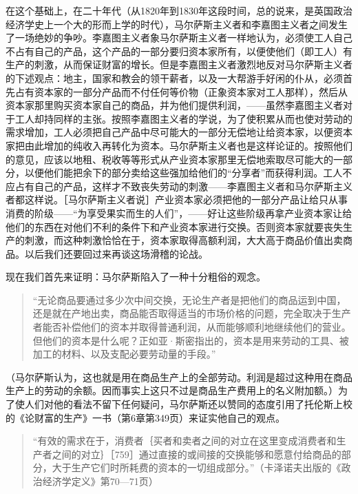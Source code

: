 在这个基础上，在二十年代（从1820年到1830年这段时间，总的说来，是英国政治经济学史上一个大的形而上学的时代），马尔萨斯主义者和李嘉图主义者之间发生了一场绝妙的争吵。李嘉图主义者象马尔萨斯主义者一样地认为，必须使工人自己不占有自己的产品，这个产品的一部分要归资本家所有，以便使他们（即工人）有生产的刺激，从而保证财富的增长。但是李嘉图主义者激烈地反对马尔萨斯主义者的下述观点：地主，国家和教会的领干薪者，以及一大帮游手好闲的仆从，必须首先占有资本家的一部分产品而不付任何等价物（正象资本家对工人那样），然后从资本家那里购买资本家自己的商品，并为他们提供利润，——虽然李嘉图主义者对于工人却持同样的主张。按照李嘉图主义者的学说，为了使积累从而也使对劳动的需求增加，工人必须把自己产品中尽可能大的一部分无偿地让给资本家，以便资本家把由此增加的纯收入再转化为资本。马尔萨斯主义者也是这样论证的。按照他们的意见，应该以地租、税收等等形式从产业资本家那里无偿地索取尽可能大的一部分，以便他们能把余下的部分卖给这些强加给他们的“分享者”而获得利润。工人不应占有自己的产品，这样才不致丧失劳动的刺激——李嘉图主义者和马尔萨斯主义者都这样说。［马尔萨斯主义者说］产业资本家必须把他的一部分产品让给只从事消费的阶级——“为享受果实而生的人们”，——好让这些阶级再拿产业资本家让给他们的东西在对他们不利的条件下和产业资本家进行交换。否则资本家就要丧失生产的刺激，而这种刺激恰恰在于，资本家取得高额利润，大大高于商品价值出卖商品。以后我们还要回过来再谈这场滑稽的论战。


现在我们首先来证明：马尔萨斯陷入了一种十分粗俗的观念。

\begin{quote}{“无论商品要通过多少次中间交换，无论生产者是把他们的商品运到中国，还是就在产地出卖，商品能否取得适当的市场价格的问题，完全取决于生产者能否补偿他们的资本并取得普通利润，从而能够顺利地继续他们的营业。但他们的资本是什么呢？正如亚·斯密指出的，资本是用来劳动的工具、被加工的材料、以及支配必要劳动量的手段。”}\end{quote}

（马尔萨斯认为，这也就是用在商品生产上的全部劳动。利润是超过这种用在商品生产上的劳动的余额。因而事实上这只不过是商品生产费用上的名义附加额。）为了使人们对他的看法不留下任何疑问，马尔萨斯还以赞同的态度引用了托伦斯上校的《论财富的生产》一书（第6章第349页）来证实他自己的观点。

\begin{quote}{“有效的需求在于，消费者｛买者和卖者之间的对立在这里变成消费者和生产者之间的对立｝［759］通过直接的或间接的交换能够和愿意付给商品的部分，大于生产它们时所耗费的资本的一切组成部分。”（卡泽诺夫出版的《政治经济学定义》第70—71页）}\end{quote}


